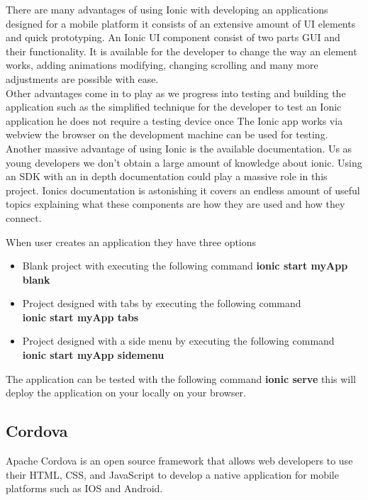 \documentclass[a4paper,12pt,twoside]{report}
\begin{document}
There are many advantages of using Ionic with developing an applications designed for a mobile platform it consists of an extensive amount of UI elements and quick prototyping. An Ionic UI component consist of two parts GUI and their functionality. It is available for the developer to change the way an element works, adding animations modifying, changing scrolling and many more adjustments are possible with ease.\\

Other advantages come in to play as we progress into testing and building the application such as the simplified technique for the developer to test an Ionic application he does not require a testing device once The Ionic app works via webview the browser on the development machine can be used for testing.\\
Another massive advantage of using Ionic is the available documentation. Us as young developers we don't obtain a large amount of knowledge about ionic. Using an SDK with an in depth documentation could play a massive role in this project.
Ionics documentation is astonishing it covers an endless amount of useful topics explaining what these components are how they are used and how they connect.\cite{ionicPros}

When user creates an application they have three options 
\begin{itemize}
    \item Blank project with executing the following command \textbf{ionic start myApp blank}
    \item Project designed with tabs by executing the following command\\ \textbf{ionic start myApp tabs}
    \item Project designed with a side menu by executing the following command\\ \textbf{ionic start myApp sidemenu}
\end{itemize}

The application can be tested with the following command \textbf{ionic serve} this will deploy the application on your locally on your browser.\cite{ionicRun}

\subsection{Cordova}
Apache Cordova is an open source framework that allows web developers to use their HTML, CSS, and JavaScript to develop a native application for mobile platforms such as IOS and Android.\\
\end{document}
